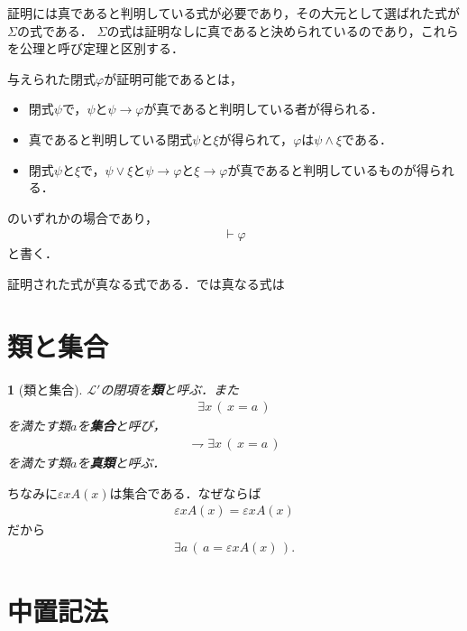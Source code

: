 \documentclass[a4j,10.5pt,oneside,openany]{jsbook}
\theoremstyle{mystyle}
\newtheorem{dfn}[thm]{\color{PakistanGreen}{定義}}
\begin{document}
	証明には真であると判明している式が必要であり，その大元として選ばれた式が$\Sigma$の式である．
	$\Sigma$の式は証明なしに真であると決められているのであり，これらを公理と呼び定理と区別する．
	
	与えられた閉式$\varphi$が証明可能であるとは，
	\begin{itemize}
		\item 閉式$\psi$で，$\psi$と$\psi \rightarrow \varphi$が真であると判明している者が得られる．
		\item 真であると判明している閉式$\psi$と$\xi$が得られて，$\varphi$は$\psi \wedge \xi$である．
		\item 閉式$\psi$と$\xi$で，$\psi \vee \xi$と$\psi \rightarrow \varphi$と$\xi \rightarrow \varphi$が真であると判明しているものが得られる．
	\end{itemize}
	
	のいずれかの場合であり，
	\begin{align}
		\vdash \varphi
	\end{align}
	と書く．
	
	証明された式が真なる式である．では真なる式は

\section{類と集合}
	\begin{screen}
		\begin{dfn}[類と集合]
			$\mathcal{L}'$の閉項を{\bf 類}と呼ぶ．また
			\begin{align}
				\exists x\, (\, x = a\, )
			\end{align}
			を満たす類$a$を{\bf 集合}と呼び，
			\begin{align}
				\rightharpoondown \exists x\, (\, x = a\, )
			\end{align}
			を満たす類$a$を{\bf 真類}と呼ぶ．
		\end{dfn}
	\end{screen}
	
	ちなみに$\varepsilon x A(x)$は集合である．なぜならば
	\begin{align}
		\varepsilon x A(x) = \varepsilon x A(x)
	\end{align}
	だから
	\begin{align}
		\exists a\, \left(\, a = \varepsilon x A(x)\, \right).
	\end{align}
	
\section{中置記法}
	
\end{document}

